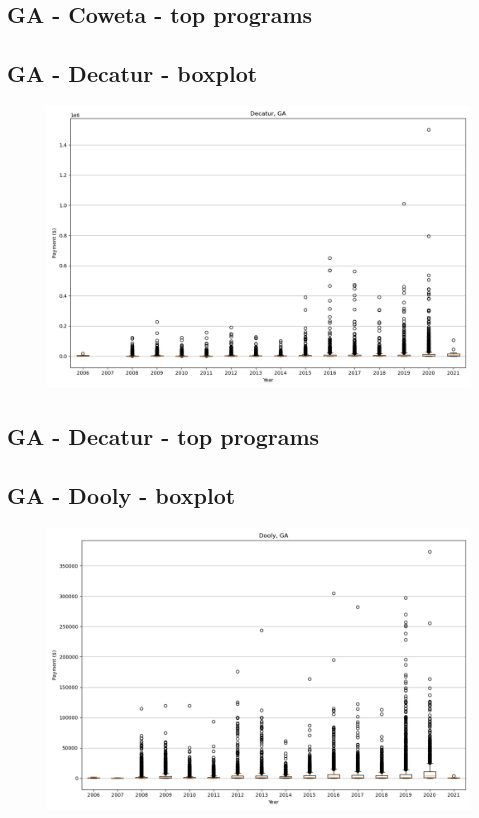 \subsection*{GA - Coweta - top programs}

\newpage
\subsection*{GA - Decatur - boxplot}
\begin{figure}[h]
\centering
\includegraphics[width=7in]{../output/boxplots/counties/Decatur-GA_boxplot.png}
\end{figure}


\subsection*{GA - Decatur - top programs}

\newpage
\subsection*{GA - Dooly - boxplot}
\begin{figure}[h]
\centering
\includegraphics[width=7in]{../output/boxplots/counties/Dooly-GA_boxplot.png}
\end{figure}


